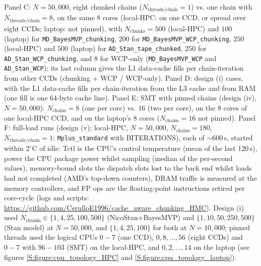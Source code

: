 \begin{table}[H]
{{        Panel C: $N{=}50,000$, eight chunked chains ($N_{\text{threads/chain}} = 1$)
        vs. one chain with $N_{\text{threads/chain}} = 8$, on the same 8 cores
        (local-HPC: on one CCD, or spread over eight CCDs; laptop: not pinned),
        with $N_{\text{chunks}} = 500$ (local-HPC) and $100$ (laptop) for \texttt{MD\_BayesMVP\_chunking},
        $200$ for \texttt{MD\_BayesMVP\_WCP\_chunking}, $250$ (local-HPC) and $500$ (laptop)
        for \texttt{AD\_Stan\_tape\_chunked}, $250$ for \texttt{AD\_Stan\_WCP\_chunking},
        and $8$ for WCP-only (\texttt{MD\_BayesMVP\_WCP} and \texttt{AD\_Stan\_WCP});
        its last column gives the L1 data-cache fills per chain-iteration from other CCDs
        (chunking + WCP / WCP-only).
        Panel D: design (i) cases, with the L1 data-cache fills per chain-iteration from the L3 cache and from RAM
        (one fill is one 64-byte cache line).
        Panel E: SMT with pinned chains (design (iv), $N{=}50,000$):
        $N_{\text{chains}} = 8$ (one per core) vs. $16$ (two per core), on the 8 cores of one local-HPC CCD,
        and on the laptop's 8 cores ($N_{\text{chains}} = 16$ not pinned).
        Panel F: full-load runs (design (v); local-HPC, $N{=}50,000$, $N_{\text{chains}} = 180$,
        $N_{\text{threads/chain}} = 1$; \texttt{Mplus\_\ab standard} with BITERATIONS), each of ${\sim}{600}$\,s,
        started within $2^{\circ}$C of idle:
        Tctl is the CPU's control temperature (mean of the last 120\,s),
        power the CPU package power whilst sampling
        (median of the per-second values), memory-bound slots the dispatch slots lost to the back end
        whilst loads had not completed (AMD's top-down counters),
        DRAM traffic is measured at the memory controllers,
        and FP ops are the floating-point instructions retired per core-cycle
        (logs and scripts: \url{https://github.com/CerulloE1996/cache_aware_chunking_HMC}).
        Design (i) used $N_{\text{chunks}} \in \{1, 4, 25, 100, 500\}$ (NicoStan+BayesMVP)
        and $\{1, 10, 50, 250, 500\}$ (Stan model) at $N{=}50,000$,
        and $\{1, 4, 25, 100\}$ for both at $N{=}10,000$;
        pinned threads used the logical CPUs $0{-}7$ (one CCD), $0, 8, \dots, 56$ (eight CCDs)
        and $0{-}7$ with $96{-}103$ (SMT) on the local-HPC, and $0, 2, \dots, 14$ on the laptop
        (see figures \ref{S:figure:cpu_topology_HPC} and \ref{S:figure:cpu_topology_laptop}).
}}
\label{table:exp4_profiling}
\PaperOneFitTable{
}
\end{table}

